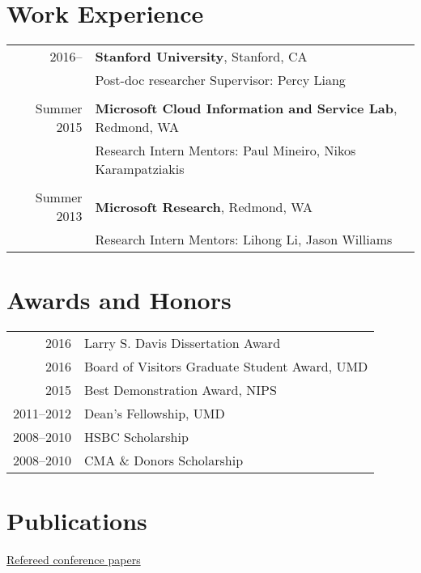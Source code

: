 \documentclass[a4paper,11pt]{article}
\begin{document}
\section{Work Experience}
\begin{tabular}{rl}    
2016-- & \textbf{Stanford University}, Stanford, CA\\
& Post-doc researcher \hspace{2em} Supervisor: Percy Liang \\
\\
Summer 2015 & {\bf Microsoft Cloud Information and Service Lab}, Redmond, WA\\
& Research Intern \hspace{2em} Mentors: Paul Mineiro, Nikos Karampatziakis\\
\\
Summer 2013 & {\bf Microsoft Research}, Redmond, WA\\
& Research Intern \hspace{2em} Mentors: Lihong Li, Jason Williams
\end{tabular}

\section{Awards and Honors}
\begin{tabular}{rl}    
2016 & Larry S. Davis Dissertation Award\\
2016 & Board of Visitors Graduate Student Award, UMD\\
2015 & Best Demonstration Award, NIPS\\
2011--2012 & Dean's Fellowship, UMD \\
2008--2010 & HSBC Scholarship \\
2008--2010 & CMA \& Donors Scholarship\\
\end{tabular}

\section{Publications}
{\underline{Refereed conference papers}}
\end{document}
